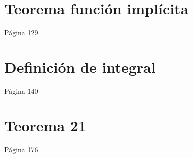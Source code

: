 \documentclass{article}
\theoremstyle{break}
\begin{document}
\section{Teorema función implícita}
Página 129

\section{Definición de integral}
Página 140

\section{Teorema 21}
Página 176
\end{document}
